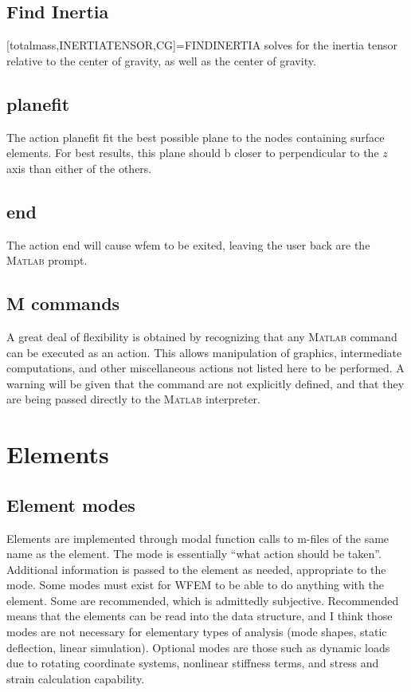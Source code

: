 \documentclass[12pt]{article}
\newcommand*{\command}[1]{\textsf{#1}}
\begin{document}
\subsection{Find Inertia}
[totalmass,INERTIATENSOR,CG]=FINDINERTIA solves for the inertia tensor
  relative to the center of gravity, as well as the center of gravity.

\subsection{planefit}
The action \command{planefit} fit the best possible plane to the nodes containing surface elements. For best results, this plane should b closer to perpendicular to the $z$ axis than either of the others.
\subsection{end}
The action \command{end} will cause wfem to be exited, leaving the user back are the M\textsc{atlab} prompt.
\subsection{M commands}
A great deal of flexibility is obtained by recognizing that any M\textsc{atlab} command can be executed as an action. This allows manipulation of graphics, intermediate computations, and other miscellaneous actions not listed here to be performed. A warning will be given that the command are not explicitly defined, and that they are being passed directly to the M\textsc{atlab} interpreter.

\section{Elements}\label{sec:elements}

\subsection{Element modes}
Elements are implemented through modal function calls to m-files of
the same name as the element. The mode is essentially ``what action
should be taken''. Additional information is passed to the element as
needed, appropriate to the mode. Some modes must exist for WFEM to be
able to do anything with the element. Some are recommended, which is
admittedly subjective. Recommended means that the elements can be read
into the data structure, and I think those modes are not necessary for
elementary types of analysis (mode shapes, static deflection, linear
simulation). Optional modes are those such as dynamic loads due to
rotating coordinate systems, nonlinear stiffness terms, and stress and
strain calculation capability.
\end{document}
